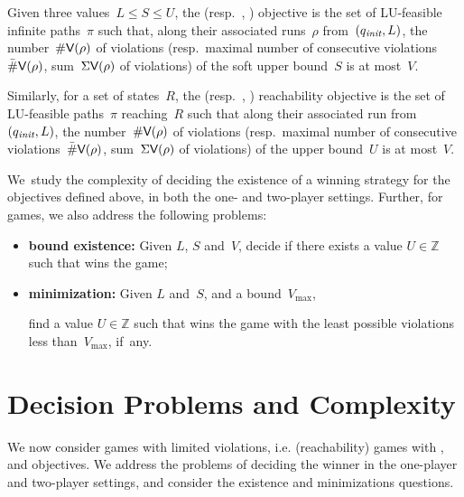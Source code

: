   Given three values~$L\leq S \leq U$, the \LVenergynb (resp.~\LVenergyconsnb, \LVenergysum) objective is
  the set of LU-feasible infinite paths~$\pi$ such that, along their
  associated runs~$\rho$ from~$(q_{\textit{init}}, L)$, the number~$\#\textsf{V}(\rho)$ of
  violations (resp.~maximal number of consecutive
  violations~$\bar\#\textsf{V}(\rho)$, sum~$\Sigma\textsf{V}(\rho)$ of violations) of the
  soft upper bound~$S$ is at most~$V$.
  
  Similarly, for a set of states~$R$, the \LVenergynb
  (resp.~\LVenergyconsnb, \LVenergysum) reachability objective is the
  set of LU-feasible paths~$\pi$ reaching~$R$ such that along their
  associated run from~$(q_{\textit{init}}, L)$, the number~$\#\textsf{V}(\rho)$ of
  violations (resp.~maximal number of consecutive
  violations~$\bar\#\textsf{V}(\rho)$, sum~$\Sigma\textsf{V}(\rho)$ of violations) of the
  upper bound~$U$ is at most~$V$.

We~study the complexity of deciding the existence of a winning
strategy for the objectives defined above, in both the one- and
two-player settings. Further, for \LVenergyall games,
we also address the following problems:
\begin{itemize}

\item {\bfseries bound existence:} Given $L$, $S$ and~$V$, decide if there exists a value $U\in \mathbb Z$ such that  wins the \LVenergyall game;
\item {\bfseries minimization:} Given $L$ and~$S$, and a bound~$V_{\max}$,

  find a value $U\in \mathbb Z$ such that  wins the game
with the least possible violations less than~$V_{\max}$, if~any.
\end{itemize}
 

\section{Decision Problems and Complexity}
We now consider games with limited violations, i.e. (reachability)
games with \LVenergynb, \LVenergyconsnb and \LVenergysum
objectives. We address the problems of deciding the winner
in the one-player and two-player settings, and consider the existence and minimizations questions.

